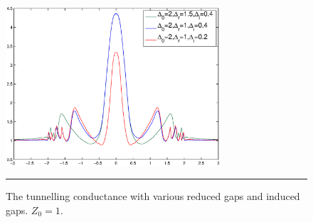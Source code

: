 \begin{figure}[htbp]
\small
	\centering
		\includegraphics[width=8cm]{./Figures/fulldabfull.eps}
		\rule{35em}{0.5pt}
	\caption[An Electron]{The tunnelling conductance with various reduced gaps and induced gaps. $Z_0=1$.}
	\label{dabfullfull}
\end{figure}

